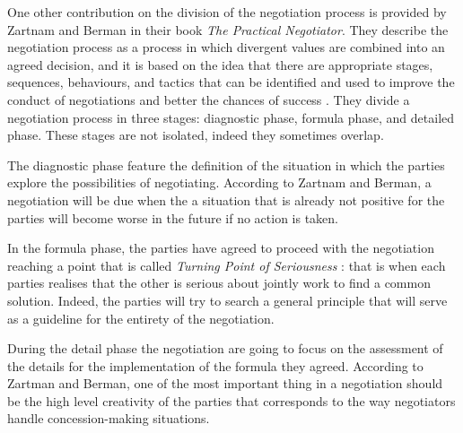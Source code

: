 \documentclass[../main.tex]{subfiles}
\begin{document}
One other contribution on the division of the negotiation process is provided by Zartnam and Berman in their book \textit{The Practical Negotiator}. They describe the negotiation process as a process in which divergent values are combined into an agreed decision, and it is based on the idea that there are appropriate stages, sequences, behaviours, and tactics that can be identified and used to improve the conduct of negotiations and better the chances of success \autocite[2]{zartman1982practical}. They divide a negotiation process in three stages: diagnostic phase, formula phase, and detailed phase. These stages are not isolated, indeed they sometimes overlap.

The diagnostic phase feature the definition of the situation in which the parties explore the possibilities of negotiating. According to Zartnam and Berman, a negotiation will be due when the a situation that is already not positive for the parties will become worse in the future if no action is taken.

In the formula phase, the parties have agreed to proceed with the negotiation reaching a point that is called \textit{Turning Point of Seriousness} \autocite[3]{zartman1982practical}: that is when each parties realises that the other is serious about jointly work to find a common solution. Indeed, the parties will try to search a general principle that will serve as a guideline for the entirety of the negotiation.

During the detail phase the negotiation are going to focus on the assessment of the details for the implementation of the formula they agreed. According to Zartman and Berman, one of the most important thing in a negotiation should be the high level creativity of the parties that corresponds to  the way negotiators handle concession-making situations.
\end{document}
